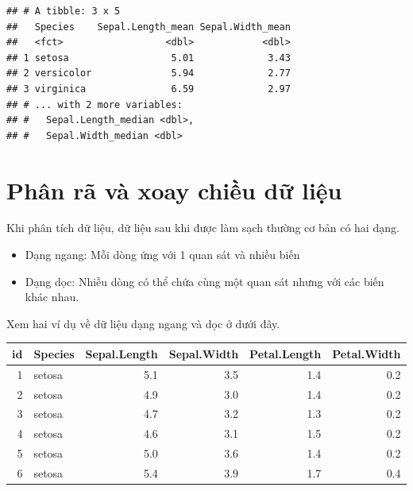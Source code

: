 \documentclass[]{krantz}
\makeatletter
\newenvironment{Shaded}{\begin{snugshade}}{\end{snugshade}}
\newcommand{\KeywordTok}[1]{\textcolor[rgb]{0.27,0.27,0.27}{\textbf{#1}}}
\newcommand{\NormalTok}[1]{#1}
\newcommand{\OperatorTok}[1]{\textcolor[rgb]{0.43,0.43,0.43}{\textbf{#1}}}
\newcommand{\StringTok}[1]{\textcolor[rgb]{0.5,0.5,0.5}{#1}}
\providecommand{\tightlist}{%
  \setlength{\itemsep}{0pt}\setlength{\parskip}{0pt}}
\newenvironment{kframe}{%
\medskip{}
\setlength{\fboxsep}{.8em}
 \def\at@end@of@kframe{}%
 \ifinner\ifhmode%
  \def\at@end@of@kframe{\end{minipage}}%
  \begin{minipage}{\columnwidth}%
 \fi\fi%
 \def\FrameCommand##1{\hskip\@totalleftmargin \hskip-\fboxsep
 \colorbox{shadecolor}{##1}\hskip-\fboxsep
     \hskip-\linewidth \hskip-\@totalleftmargin \hskip\columnwidth}%
 \MakeFramed {\advance\hsize-\width
   \@totalleftmargin\z@ \linewidth\hsize
   \@setminipage}}%
 {\par\unskip\endMakeFramed%
 \at@end@of@kframe}
\renewenvironment{Shaded}{\begin{kframe}}{\end{kframe}}
\renewenvironment{Shaded}{\begin{snugshade}}{\end{snugshade}}
\renewcommand{\KeywordTok}[1]{\textcolor[rgb]{0.13,0.29,0.53}{\textbf{#1}}}
\renewcommand{\NormalTok}[1]{#1}
\renewcommand{\OperatorTok}[1]{\textcolor[rgb]{0.81,0.36,0.00}{\textbf{#1}}}
\renewcommand{\StringTok}[1]{\textcolor[rgb]{0.31,0.60,0.02}{#1}}
\theoremstyle{definition}
\theoremstyle{definition}
\theoremstyle{definition}
\theoremstyle{remark}
\makeatother
\begin{document}
\begin{Shaded}
\end{Shaded}

\begin{verbatim}
## # A tibble: 3 x 5
##   Species    Sepal.Length_mean Sepal.Width_mean
##   <fct>                  <dbl>            <dbl>
## 1 setosa                  5.01             3.43
## 2 versicolor              5.94             2.77
## 3 virginica               6.59             2.97
## # ... with 2 more variables:
## #   Sepal.Length_median <dbl>,
## #   Sepal.Width_median <dbl>
\end{verbatim}

\hypertarget{phan-ra-va-xoay-chiu-d-liu}{%
\chapter{Phân rã và xoay chiều dữ
liệu}\label{phan-ra-va-xoay-chiu-d-liu}}

Khi phân tích dữ liệu, dữ liệu sau khi được làm sạch thường cơ bản có
hai dạng.

\begin{itemize}
\tightlist
\item
  Dạng ngang: Mỗi dòng ứng với 1 quan sát và nhiều biến
\item
  Dạng dọc: Nhiều dòng có thể chứa cùng một quan sát nhưng với các biến
  khác nhau.
\end{itemize}

Xem hai ví dụ về dữ liệu dạng ngang và dọc ở dưới đây.

\begin{tabular}{rlrrrr}
\toprule
id & Species & Sepal.Length & Sepal.Width & Petal.Length & Petal.Width\\
\midrule
1 & setosa & 5.1 & 3.5 & 1.4 & 0.2\\
2 & setosa & 4.9 & 3.0 & 1.4 & 0.2\\
3 & setosa & 4.7 & 3.2 & 1.3 & 0.2\\
4 & setosa & 4.6 & 3.1 & 1.5 & 0.2\\
5 & setosa & 5.0 & 3.6 & 1.4 & 0.2\\
6 & setosa & 5.4 & 3.9 & 1.7 & 0.4\\
\bottomrule
\end{tabular}
\end{document}
